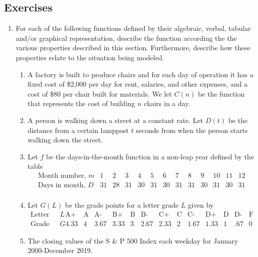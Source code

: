 \documentclass[
]{book}
\theoremstyle{definition}
\theoremstyle{definition}
\theoremstyle{definition}
\theoremstyle{definition}
\theoremstyle{remark}
\begin{document}
\hypertarget{exercises-27}{%
\subsection{Exercises}\label{exercises-27}}

\begin{enumerate}
\def\labelenumi{\arabic{enumi}.}
\item
  For each of the following functions defined by their algebraic, verbal, tabular and/or graphical representation, describe the function according the the various properties described in this section. Furthermore, describe how these properties relate to the situation being modeled.

  \begin{enumerate}
  \def\labelenumii{\alph{enumii}.}
  \item
    A factory is built to produce chairs and for each day of operation it has a fixed cost of \$2,000 per day for rent, salaries, and other expenses, and a cost of \$80 per chair built for materials. We let \(C(n)\) be the function that represents the cost of building \(n\) chairs in a day.
  \item
    A person is walking down a street at a constant rate. Let \(D(t)\) be the distance from a certain lamppost \(t\) seconds from when the person starts walking down the street.
  \item
    Let \(f\) be the days-in-the-month function in a non-leap year defined by the table
    \[\begin{array}{l|cccccccccccc}
         \mbox{Month number, } m & 1 & 2 & 3 & 4 & 5 & 6 & 7 & 8 & 9 & 10 & 11 & 12 \\ \hline
         \mbox{Days in month, } D & 31 & 28 & 31 & 30 & 31 & 30 & 31 & 31 & 30 & 31 & 30 & 31 \\
         \end{array}\]
  \item
    Let \(G(L)\) be the grade points for a letter grade \(L\) given by
    \[\begin{array}{l|ccccccccccccc}
         \mbox{Letter grade, } L & \mbox{A+} & \mbox{A} & \mbox{A-} & \mbox{B+} & \mbox{B} & \mbox{B-} & \mbox{C+} & \mbox{C} & \mbox{C-} & \mbox{D+} & \mbox{D} & \mbox{D-} & \mbox{F} \\ \hline
         \mbox{Grade Points, } G & 4.33 & 4 & 3.67 & 3.33 & 3 & 2.67 & 2.33 & 2 & 1.67 & 1.33 & 1 & .67 & 0 
         \end{array}\]
  \item
    The closing values of the S \& P 500 Index each weekday for January 2000-December 2019.
  \end{enumerate}


\end{enumerate}
\end{document}
